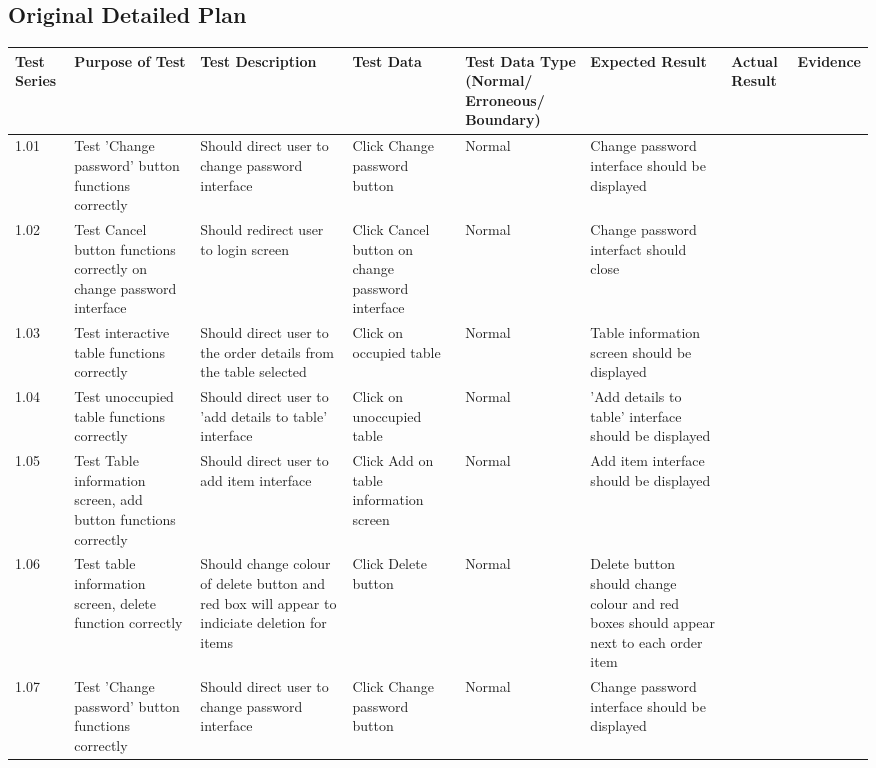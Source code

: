 \begin{landscape}
\subsection{Original Detailed Plan}

\begin{center}
    \begin{longtable}{|p{1.5cm}|p{2.5cm}|p{2.5cm}|p{2cm}|p{2cm}|p{2cm}|p{2cm}|p{2cm}|}
        \hline
        \textbf{Test Series} & \textbf{Purpose of Test} & \textbf{Test Description} & \textbf{Test Data} & \textbf{Test Data Type (Normal/ Erroneous/ Boundary)} & \textbf{Expected Result} & \textbf{Actual Result} & \textbf{Evidence}\\ \hline
        1.01 & Test 'Change password' button functions correctly & Should direct user to change password interface  & Click Change password button & Normal & Change password interface should be displayed &  &  \\ \hline
        1.02 & Test Cancel button functions correctly on change password interface & Should redirect user to login screen  & Click Cancel button on change password interface & Normal & Change password interfact should close &  &  \\ \hline
        1.03 & Test interactive table functions correctly & Should direct user to the order details from the table selected  & Click on occupied table & Normal & Table  information screen should be displayed &  &  \\ \hline
        1.04 & Test unoccupied table functions correctly & Should direct user to 'add details to table'  interface  & Click on unoccupied table & Normal & 'Add details to table' interface should be displayed &  &  \\ \hline
        1.05 & Test Table information screen, add button functions correctly & Should direct user to add item  interface  & Click Add on table information screen & Normal & Add item interface should be displayed &  &  \\ \hline
        1.06 & Test table information screen, delete function correctly & Should change colour of delete button and red box will appear to indiciate deletion for items  & Click Delete button & Normal & Delete button should change colour and red boxes should appear next to each order item &  &  \\ \hline
        1.07 & Test 'Change password' button functions correctly & Should direct user to change password interface  & Click Change password button & Normal & Change password interface should be displayed &  &  \\ \hline

\end{longtable}
\end{center}
\end{landscape}
